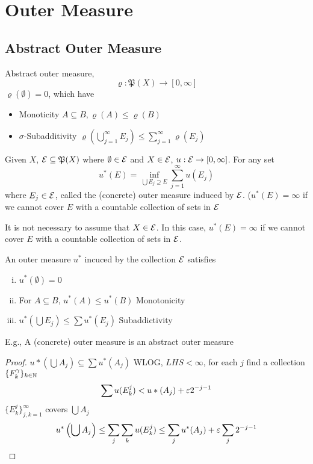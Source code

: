 \chapter{Outer Measure}
\section{Abstract Outer Measure}

\begin{definition}
  Abstract outer measure, 
  \[\varrho: \mathfrak{P}(X) \to [0, \infty]\]
  $\varrho(\emptyset) = 0$, which have
  \begin{itemize}
    \item Monoticity $A \subseteq B, \varrho(A) \le \varrho(B)$
    \item $\sigma$-Subadditivity $\varrho\left(\bigcup_{j=1}^\infty E_j\right) \le \sum_{j=1}^\infty \varrho(E_j)$
  \end{itemize}
\end{definition}


\begin{definition}
  Given $X$, $\mathcal E \subseteq \mathfrak{P}(X)$ where $\emptyset \in \mathcal E$ and $X \in \mathcal E$, $u: \mathcal E \to [0, \infty]$.
  For any set 
  \[u^*(E) = \inf_{\bigcup E_j \supseteq E}\sum_{j=1}^\infty u(E_j)\]
  where $E_j \in \mathcal E$, called the (concrete) outer measure induced by $\mathcal E$.
  ($u^*(E) = \infty$ if we cannot cover $E$ with a countable collection of sets in $\mathcal E$
\end{definition}

\begin{remark}
  It is not necessary to assume that $X \in \mathcal E$.
  In this case, $u^*(E) = \infty$ if we cannot cover $E$ with a countable collection of sets in $\mathcal E$.
\end{remark}

\begin{lemma}
  An outer measure $u^*$ incuced by the collection $\mathcal E$ satisfies
  \begin{enumerate}[(i)]
    \item $u^*(\emptyset) = 0$
    \item For $A \subseteq B$, $u^*(A) \le u^*(B)$ Monotonicity
    \item $u^*(\bigcup E_j) \le \sum u^*(E_j)$ Subaddictivity
  \end{enumerate}
  E.g., A (concrete) outer measure is an abstract outer measure
\end{lemma}

\begin{proof}
  $u*(\bigcup A_j) \subseteq \sum u^*(A_j)$
  WLOG, $LHS < \infty$, for each $j$ find a collection $\{F_k^\gamma\}_{k \in \mathbb N}$
  \[\sum u(E_k^j) < u*(A_j) + \varepsilon 2^{-j-1}\]
  $\{E_k^j\}_{j, k=1}^\infty$ covers $\bigcup A_j$
  \[u^*\left(\bigcup A_j\right)\le \sum_j\sum_k u(E_k^j) \le \sum_j u^*(A_j) + \varepsilon \sum_j {2^{-j-1}}\]
\end{proof}

